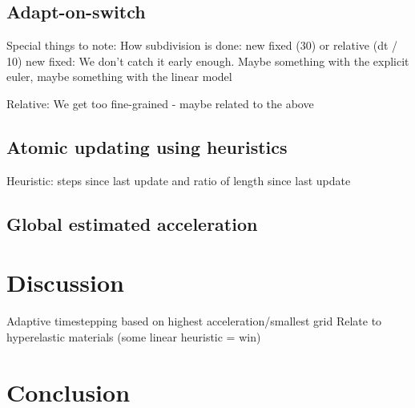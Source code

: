\documentclass[11pt]{article}
\begin{document}
\subsection{Adapt-on-switch}
Special things to note: How subdivision is done: new fixed (30) or relative (dt / 10)
new fixed: We don't catch it early enough. Maybe something with the explicit
euler, maybe something with the linear model

Relative: We get too fine-grained - maybe related to the above

\subsection{Atomic updating using heuristics}

Heuristic: steps since last update and ratio of length since last update

\subsection{Global estimated acceleration}


%


\section{Discussion}

Adaptive timestepping based on highest acceleration/smallest grid
Relate to hyperelastic materials (some linear heuristic = win)


\section{Conclusion}




\end{document}
